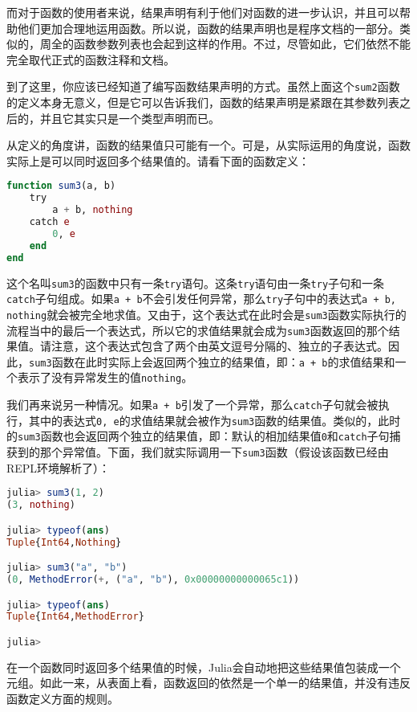而对于函数的使用者来说，结果声明有利于他们对函数的进一步认识，并且可以帮助他们更加合理地运用函数。所以说，函数的结果声明也是程序文档的一部分。类似的，周全的函数参数列表也会起到这样的作用。不过，尽管如此，它们依然不能完全取代正式的函数注释和文档。

到了这里，你应该已经知道了编写函数结果声明的方式。虽然上面这个\verb|sum2|函数的定义本身无意义，但是它可以告诉我们，函数的结果声明是紧跟在其参数列表之后的，并且它其实只是一个类型声明而已。

从定义的角度讲，函数的结果值只可能有一个。可是，从实际运用的角度说，函数实际上是可以同时返回多个结果值的。请看下面的函数定义：

\begin{lstlisting}[language=julia]
function sum3(a, b)
    try
        a + b, nothing
    catch e
        0, e
    end
end
\end{lstlisting}

这个名叫\verb|sum3|的函数中只有一条\verb|try|语句。这条\verb|try|语句由一条\verb|try|子句和一条\verb|catch|子句组成。如果\verb|a + b|不会引发任何异常，那么\verb|try|子句中的表达式\verb|a + b, nothing|就会被完全地求值。又由于，这个表达式在此时会是\verb|sum3|函数实际执行的流程当中的最后一个表达式，所以它的求值结果就会成为\verb|sum3|函数返回的那个结果值。请注意，这个表达式包含了两个由英文逗号分隔的、独立的子表达式。因此，\verb|sum3|函数在此时实际上会返回两个独立的结果值，即：\verb|a + b|的求值结果和一个表示了没有异常发生的值\verb|nothing|。

我们再来说另一种情况。如果\verb|a + b|引发了一个异常，那么\verb|catch|子句就会被执行，其中的表达式\verb|0, e|的求值结果就会被作为\verb|sum3|函数的结果值。类似的，此时的\verb|sum3|函数也会返回两个独立的结果值，即：默认的相加结果值\verb|0|和\verb|catch|子句捕获到的那个异常值。下面，我们就实际调用一下\verb|sum3|函数（假设该函数已经由REPL环境解析了）：

\begin{lstlisting}[language=julia]
julia> sum3(1, 2)
(3, nothing)

julia> typeof(ans)
Tuple{Int64,Nothing}

julia> sum3("a", "b")
(0, MethodError(+, ("a", "b"), 0x00000000000065c1))

julia> typeof(ans)
Tuple{Int64,MethodError}

julia> 
\end{lstlisting}

在一个函数同时返回多个结果值的时候，Julia会自动地把这些结果值包装成一个元组。如此一来，从表面上看，函数返回的依然是一个单一的结果值，并没有违反函数定义方面的规则。

